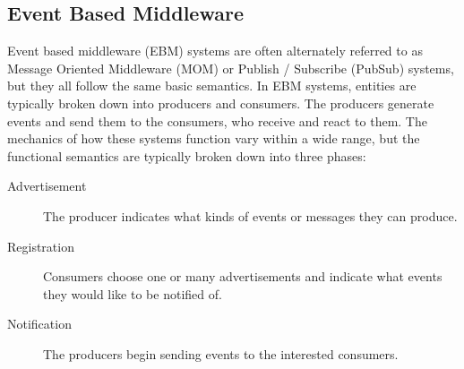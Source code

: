 \documentclass{acm_proc_article-sp}
\begin{document}




\subsection{Event Based Middleware}
\label{sec:techeb}

Event based middleware (EBM) systems are often alternately referred to as Message Oriented Middleware (MOM) or Publish / Subscribe (PubSub) systems, but they all follow the same basic semantics. In EBM systems, entities are typically broken down into producers and consumers. The producers generate events and send them to the consumers, who receive and react to them. The mechanics of how these systems function vary within a wide range, but the functional semantics are typically broken down into three phases:

\begin{description}
\item[Advertisement] The producer indicates what kinds of events or messages they can produce.
\item[Registration] Consumers choose one or many advertisements and indicate what events they would like to be notified of.
\item[Notification] The producers begin sending events to the interested consumers.
\end{description}
\end{document}
